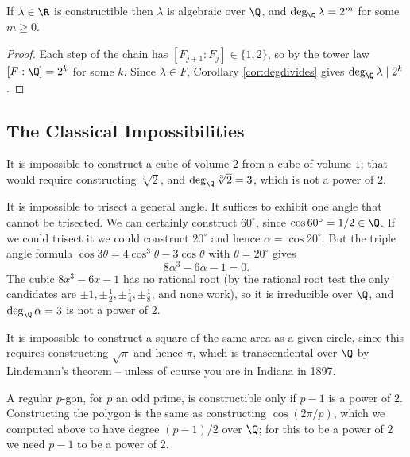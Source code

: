 \begin{corollary}\label{cor:construct}
	If $\lambda \in \R$ is constructible then $\lambda$ is algebraic over $\Q$, and $\deg_\Q \lambda = 2^m$ for some $m \geq 0$.
\end{corollary}

\begin{proof}
	Each step of the chain has $[F_{j+1}:F_j] \in \{1,2\}$, so by the tower law $[F:\Q] = 2^k$ for some $k$. Since $\lambda \in F$, Corollary \ref{cor:degdivides} gives $\deg_\Q \lambda \mid 2^k$.
\end{proof}

\subsection{The Classical Impossibilities}

\begin{example}
	It is impossible to construct a cube of volume $2$ from a cube of volume $1$; that would require constructing $\sqrt[3]{2}$, and $\deg_\Q \sqrt[3]{2} = 3$, which is not a power of $2$.
\end{example}

\begin{example}
	It is impossible to trisect a general angle. It suffices to exhibit one angle that cannot be trisected. We can certainly construct $60^\circ$, since $\cos 60^\circ = 1/2 \in \Q$. If we could trisect it we could construct $20^\circ$ and hence $\alpha = \cos 20^\circ$. But the triple angle formula $\cos 3\theta = 4\cos^3\theta - 3\cos\theta$ with $\theta = 20^\circ$ gives
	$$8\alpha^3 - 6\alpha - 1 = 0.$$
	The cubic $8x^3 - 6x - 1$ has no rational root (by the rational root test the only candidates are $\pm 1, \pm\frac12, \pm\frac14, \pm\frac18$, and none work), so it is irreducible over $\Q$, and $\deg_\Q \alpha = 3$ is not a power of $2$.
\end{example}

\begin{example}
	It is impossible to construct a square of the same area as a given circle, since this requires constructing $\sqrt \pi$ and hence $\pi$, which is transcendental over $\Q$ by Lindemann's theorem -- unless of course you are in Indiana in 1897.
\end{example}

\begin{example}
	A regular $p$-gon, for $p$ an odd prime, is constructible only if $p - 1$ is a power of $2$. Constructing the polygon is the same as constructing $\cos(2\pi/p)$, which we computed above to have degree $(p-1)/2$ over $\Q$; for this to be a power of $2$ we need $p-1$ to be a power of $2$.
\end{example}

